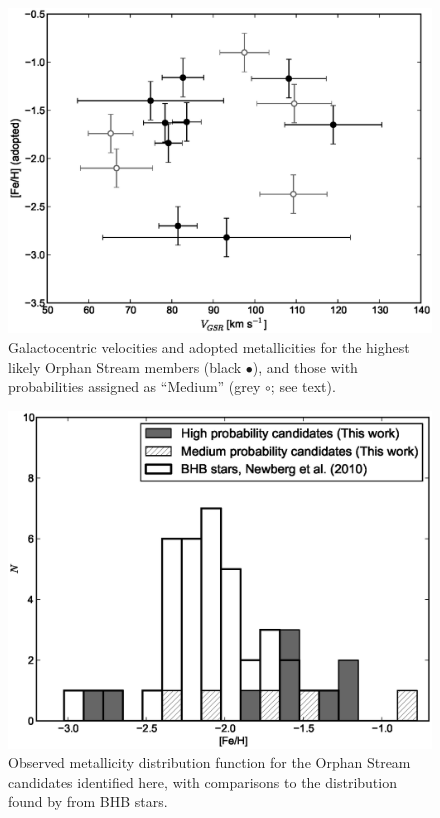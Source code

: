 \documentclass[10pt,apjl]{emulateapj}
\begin{document}
\begin{figure}[h!]
	\includegraphics[width=\columnwidth]{./fig5.eps}
	\caption{Galactocentric velocities and adopted metallicities for the highest likely Orphan Stream members (black $\bullet$), and those with probabilities assigned as ``Medium'' (grey $\circ$; see text).}
	\label{fig:vgsr-feh}
\end{figure}

\begin{figure}[h!]
	\includegraphics[width=\columnwidth]{./fig6.eps}
	\caption{Observed metallicity distribution function for the Orphan Stream candidates identified here, with comparisons to the distribution found by \citet{Newberg_et-al_2010} from BHB stars.}
	\label{fig:newberg-feh}
\end{figure}
\end{document}
